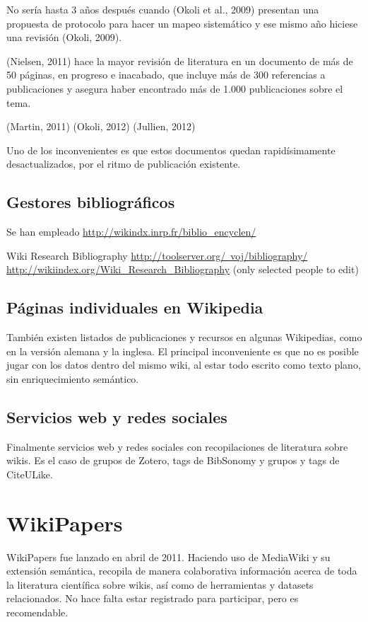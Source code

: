\documentclass[twoside]{article}
\begin{document}
\begin{multicols}{2}
No ser\'{i}a hasta 3 a\~{n}os despu\'{e}s cuando (Okoli et al., 2009) presentan una propuesta de protocolo para hacer un mapeo sistem\'{a}tico y ese mismo a\~{n}o hiciese una revisi\'{o}n (Okoli, 2009).

(Nielsen, 2011) hace la mayor revisi\'{o}n de literatura en un documento de m\'{a}s de 50 p\'{a}ginas, en progreso e inacabado, que incluye m\'{a}s de 300 referencias a publicaciones y asegura haber encontrado m\'{a}s de 1.000 publicaciones sobre el tema.

(Martin, 2011)
(Okoli, 2012)
(Jullien, 2012)

Uno de los inconvenientes es que estos documentos quedan rapid\'{i}simamente desactualizados, por el ritmo de publicaci\'{o}n existente.

\subsection{Gestores bibliogr\'{a}ficos}
Se han empleado \href{http://wikindx.inrp.fr/biblio_encyclen/}{http://wikindx.inrp.fr/biblio\_encyclen/}

Wiki Research Bibliography
\href{http://toolserver.org/~voj/bibliography/}{http://toolserver.org/~voj/bibliography/}
\href{http://wikiindex.org/Wiki_Research_Bibliography}{http://wikiindex.org/Wiki\_Research\_Bibliography}
(only selected people to edit)

\subsection{P\'{a}ginas individuales en Wikipedia}
Tambi\'{e}n existen listados de publicaciones y recursos en algunas Wikipedias, como en la versi\'{o}n alemana y la inglesa. El principal inconveniente es que no es posible jugar con los datos dentro del mismo wiki, al estar todo escrito como texto plano, sin enriquecimiento sem\'{a}ntico.

\subsection{Servicios web y redes sociales}
Finalmente servicios web y redes sociales con recopilaciones de literatura sobre wikis. Es el caso de grupos de Zotero, tags de BibSonomy y grupos y tags de CiteULike.

\section{WikiPapers}
WikiPapers fue lanzado en abril de 2011. Haciendo uso de MediaWiki y su extensi\'{o}n sem\'{a}ntica, recopila de manera colaborativa informaci\'{o}n acerca de toda la literatura cient\'{i}fica sobre wikis, as\'{i} como de herramientas y datasets relacionados. No hace falta estar registrado para participar, pero es recomendable.


\end{multicols}
\end{document}
